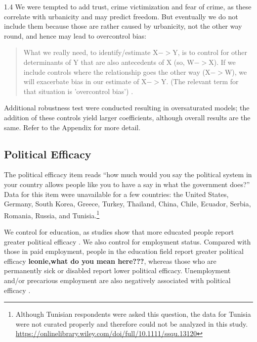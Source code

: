 \documentclass[10pt, letterpaper]{article}
\begin{document}
\begin{spacing}{1.4}
We were tempted to add trust, crime victimization and fear of crime, as these correlate with urbanicity and may predict freedom. 
But eventually we do not include them because those are rather caused by urbanicity, not the other way round, and hence may lead to overcontrol bias:
\begin{quote}
What we really need, to identify/estimate X$->$Y, is to control for other
determinants of Y that are also antecedents of X (so, W$->$X). If we include
controls where the relationship goes the other way (X$->$W), we will exacerbate
bias in our estimate of X$->$Y. (The relevant term for that situation is 'overcontrol bias') \citep[][p. 5]{bartram24}.
\end{quote}
Additional robustness test were conducted resulting in oversaturated models; the addition of these controls yield larger coefficients, although overall results are the same. Refer to the Appendix for more detail.

\subsection{Political Efficacy}
 The  political efficacy item reads ``how much would you
 say the political system in your country allows people like you to have a say in what the government does?''
 Data for this item were unavailable for a few countries: the United States, Germany, South Korea, Greece, Turkey, Thailand, China, Chile, Ecuador, Serbia, Romania, Russia, and
 Tunisia.\footnote{Although Tunisian respondents were asked this question, the data for Tunisia were not curated properly and therefore could not be analyzed in this study. \url{https://onlinelibrary.wiley.com/doi/full/10.1111/ssqu.13120}} 
 
We control for education, as studies show that more educated people report greater political efficacy
\citep{emmenegger2015labour,garcia2024they,marx2016unemployed,rowland2024political}. We
also control for employment status. Compared with those in paid employment,
people in the education field report greater political efficacy
\textbf{leonie,what do you mean here???},
whereas those who are permanently sick or disabled report lower political efficacy\citep{luukkonen2022urbanisation}. Unemployment and/or precarious employment are also negatively associated with political efficacy
\citep{emmenegger2015labour,marx2016unemployed}. 


\end{spacing}
\end{document}
